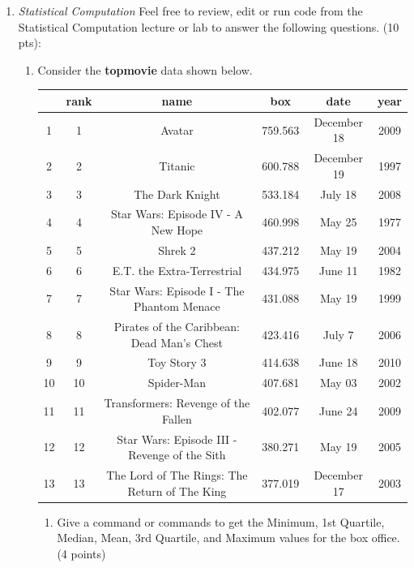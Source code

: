 \documentclass[10pt]{article}
\begin{document}
\begin{enumerate}
\begin{enumerate}
\end{enumerate}

\newpage

\item \textit{Statistical Computation} Feel free to review, edit or run code from the Statistical Computation lecture or lab to answer the following questions. (10 pts):

\begin{enumerate}
	\item Consider the \textbf{topmovie} data shown below. 
	
\begin{tabular}{|c|c|c|c|c|c|}
	\hline
  & \textbf{rank} & \textbf{name} & \textbf{box} & \textbf{date} & \textbf{year} \\ \hline
1 &1 &Avatar & 759.563 &December 18 & 2009 \\ \hline
2 & 2 & Titanic & 600.788 & December 19 & 1997 \\ \hline
3 & 3 & The Dark Knight & 533.184 & July 18 & 2008 \\ \hline
4 & 4 & Star Wars: Episode IV - A New Hope & 460.998 & May 25 & 1977 \\ \hline
5 & 5 & Shrek 2 & 437.212 & May 19 & 2004 \\ \hline
6 & 6 & E.T. the Extra-Terrestrial & 434.975 & June 11 & 1982 \\ \hline
7 & 7 & Star Wars: Episode I - The Phantom Menace & 431.088 & May 19 & 1999 \\ \hline
8 & 8 & Pirates of the Caribbean: Dead Man's Chest & 423.416 & July 7 & 2006 \\ \hline
9 & 9 & Toy Story 3 & 414.638 & June 18 & 2010 \\ \hline
10 & 10 & Spider-Man & 407.681 & May 03 & 2002 \\ \hline
11 & 11 & Transformers: Revenge of the Fallen & 402.077 & June 24 & 2009 \\ \hline
12 & 12 & Star Wars: Episode III - Revenge of the Sith & 380.271 & May 19 & 2005 \\ \hline
13 & 13 & The Lord of The Rings: The Return of The King & 377.019 & December 17 & 2003 \\ \hline
\end{tabular}
	\begin{enumerate}
		\item Give a command or commands to get the Minimum, 1st Quartile, Median, Mean, 3rd Quartile, and Maximum values for the box office. (4 points)
		\beginanswers
		\begin{itemize}

\end{itemize}
\end{enumerate}
\end{enumerate}
\end{enumerate}
\end{document}
